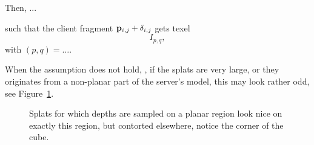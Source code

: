 Then, ...

such that the client fragment $\mathbf{p}_{i, j} + \delta_{i, j}$ gets texel
\[
  I_{p, q},
\]
with $(p, q) = \ldots$.

When the assumption does not hold, \eg, if the splats are very large, or they
originates from a non-planar part of the server's model, this may look rather
odd, see Figure~\ref{fig:LargeSplatsOnCorners}.

\begin{figure}[htb]
  \centering
  \caption{\label{fig:LargeSplatsOnCorners}
           Splats for which depths are sampled on a planar region look nice on
  exactly this region, but contorted elsewhere, notice the corner of the cube.}
\end{figure}

